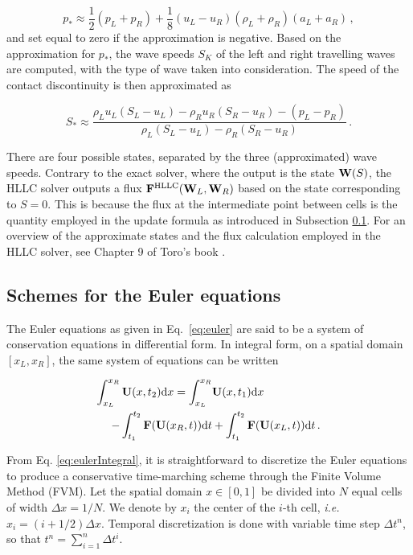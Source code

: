 \documentclass[final,3p,twocolumn,times]{elsarticle}
\begin{document}
\begin{equation}
    p_* \approx \frac{1}{2}(p_L+p_R) 
    +\frac{1}{8}(u_L-u_R)(\rho_L+\rho_R)(a_L+a_R) \,,
    \label{eq:pressureHLLC}
\end{equation}
%
and set equal to zero if the approximation is negative. Based on the
approximation for $p_*$, the wave speeds $S_K$ of the left and right travelling
waves are computed, with the type of wave taken into consideration. The speed
of the contact discontinuity is then approximated as

\begin{equation}
    S_* \approx \frac{\rho_L u_L(S_L-u_L)-\rho_R
    u_R(S_R-u_R)-(p_L-p_R)}{\rho_L(S_L-u_L)-\rho_R(S_R-u_R)} \,.
    \label{eq:speedHLLC}
\end{equation}

There are four possible states, separated by the three (approximated) wave
speeds.  Contrary to the exact solver, where the output is the state ${\bf
W}(S)$, the HLLC solver outputs a flux ${\bf F}^{\rm HLLC}({\bf W}_L, {\bf
W}_R)$ based on the state corresponding to $S=0$. This is because the flux at
the intermediate point between cells is the quantity employed in the update
formula as introduced in Subsection \ref{subsec:eulerschemes}. For an overview
of the approximate states and the flux calculation employed in the HLLC solver,
see Chapter 9 of Toro's book \cite{toro2013riemann}. 

\subsection{Schemes for the Euler equations}
\label{subsec:eulerschemes}

The Euler equations as given in Eq.\ \eqref{eq:euler} are said to be a system
of conservation equations in differential form. In integral form, on a spatial
domain $[x_L, x_R]$, the same system of equations can be written

\begin{align}
    \nonumber
    \int_{x_L}^{x_R} {\bf U}(x,t_2) {\rm d}x = 
    \int_{x_L}^{x_R} &{\bf U}(x,t_1) {\rm d}x \\ 
    -\int_{t_1}^{t_2} {\bf F}({\bf U}(x_R,t)) {\rm d}t 
    &+ \int_{t_1}^{t_2} {\bf F}({\bf U}(x_L,t)) {\rm d}t \,.
    \label{eq:eulerIntegral}
\end{align}

From Eq. \eqref{eq:eulerIntegral}, it is straightforward to discretize the
Euler equations to produce a conservative time-marching scheme through the
Finite Volume Method (FVM). Let the spatial domain $x \in [0,1]$ be divided
into $N$ equal cells of width $\Delta x = 1/N$.  We denote by $x_i$ the center
of the $i$-th cell, \emph{i.e.~} $x_i = (i+1/2)\Delta x$. 
%
Temporal discretization is done with variable time step $\Delta t^n$, so that
$t^n = \sum_{i=1}^n \Delta t^i$. 
\end{document}
